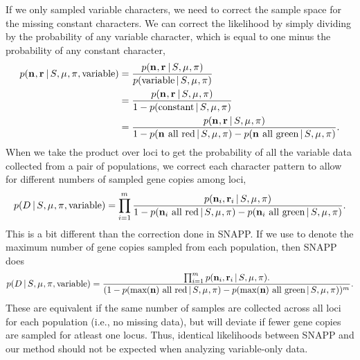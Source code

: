 If we only sampled variable characters, we need to correct the sample space for
the missing constant characters.
We can correct the likelihood by simply dividing by the probability of any
variable character, which is equal to one minus the probability of any constant
character,
\begin{equation}
\begin{split}
    \pr(\leafallelecounts, \leafredallelecounts \given \sptree, \murate, \gfreq, \textrm{variable})
    & =
    \frac{
        \pr(\leafallelecounts, \leafredallelecounts \given \sptree, \murate, \gfreq)
    }{
        \pr(\textrm{variable} \given \sptree, \murate, \gfreq)
    } \\
    & =
    \frac{
        \pr(\leafallelecounts, \leafredallelecounts \given \sptree, \murate, \gfreq)
    }{
        1 - \pr(\textrm{constant} \given \sptree, \murate, \gfreq)
    } \\
    & =
    \frac{
        \pr(\leafallelecounts, \leafredallelecounts \given \sptree, \murate, \gfreq)
    }{
        1 - \pr(\leafallelecounts \textrm{ all red} \given \sptree, \murate, \gfreq)
        - \pr(\leafallelecounts \textrm{ all green} \given \sptree, \murate, \gfreq)
    }.
    \label{eq:variablemarkerlikelihood}
\end{split}
\end{equation}
When we take the product over loci to get the probability of all the variable
data collected from a pair of populations, we correct each character pattern to
allow for different numbers of sampled gene copies among loci,
\begin{equation}
    \pr(\comparisondata \given \sptree, \murate, \gfreq, \textrm{variable})
    =
    \prod_{i=1}^{\nloci}
    \frac{
        \pr(\leafallelecounts[i], \leafredallelecounts[i] \given \sptree, \murate, \gfreq)
    }{
        1 - \pr(\leafallelecounts[i] \textrm{ all red} \given \sptree, \murate, \gfreq)
        - \pr(\leafallelecounts[i] \textrm{ all green} \given \sptree, \murate, \gfreq)
    }.
    \label{eq:variablecomparisonlikelihood}
\end{equation}
This is a bit different than the correction done in SNAPP.
If we use \maxleafallelecounts to denote the maximum number
of gene copies sampled from each population, then SNAPP does
\begin{equation}
    \pr(\comparisondata \given \sptree, \murate, \gfreq, \textrm{variable})
    =
    \frac{
        \prod_{i=1}^{\nloci}
        \pr(\leafallelecounts[i], \leafredallelecounts[i] \given \sptree, \murate, \gfreq).
    }{
        (1 - \pr(\maxleafallelecounts \textrm{ all red} \given \sptree, \murate, \gfreq)
        - \pr(\maxleafallelecounts \textrm{ all green} \given \sptree, \murate, \gfreq))^{\nloci}
    }.
    \label{eq:snappvariablecomparisonlikelihood}
\end{equation}
These are equivalent if the same number of samples are collected across all
loci for each population (i.e., no missing data), but will deviate if fewer
gene copies are sampled for atleast one locus.
Thus, identical likelihoods between SNAPP and our method should not be expected
when analyzing variable-only data.

